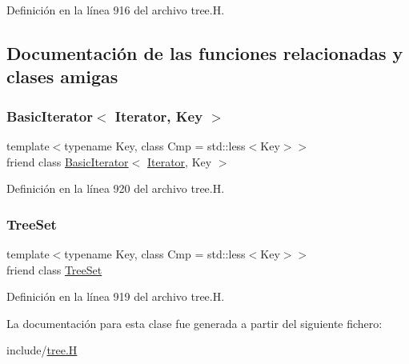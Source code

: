 Definición en la línea 916 del archivo tree.\+H.



\subsection{Documentación de las funciones relacionadas y clases amigas}
\mbox{\label{class_designar_1_1_tree_set_1_1_iterator_a0b375a570add16b09037ce1773f0ddbb}} 
\subsubsection{\texorpdfstring{Basic\+Iterator$<$ Iterator, Key $>$}{BasicIterator< Iterator, Key >}}
{\footnotesize\ttfamily template$<$typename Key, class Cmp = std\+::less$<$\+Key$>$$>$ \\
friend class \hyperlink{class_designar_1_1_basic_iterator}{Basic\+Iterator}$<$ \hyperlink{class_designar_1_1_tree_set_1_1_iterator}{Iterator}, Key $>$\hspace{0.3cm}{\ttfamily [friend]}}



Definición en la línea 920 del archivo tree.\+H.

\mbox{\label{class_designar_1_1_tree_set_1_1_iterator_a7caa42294700d2a60905ec3458a7cd8a}} 
\subsubsection{\texorpdfstring{Tree\+Set}{TreeSet}}
{\footnotesize\ttfamily template$<$typename Key, class Cmp = std\+::less$<$\+Key$>$$>$ \\
friend class \hyperlink{class_designar_1_1_tree_set}{Tree\+Set}\hspace{0.3cm}{\ttfamily [friend]}}



Definición en la línea 919 del archivo tree.\+H.



La documentación para esta clase fue generada a partir del siguiente fichero\+:\begin{DoxyCompactItemize}
\item 
include/\hyperlink{tree_8_h}{tree.\+H}\end{DoxyCompactItemize}
